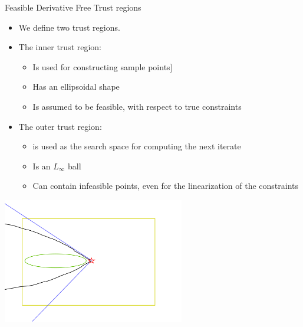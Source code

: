 \documentclass{beamer}
\begin{document}
\begin{frame}{Feasible Derivative Free Trust regions}
    \begin{itemize}
        \item We define two trust regions.
        \item The inner trust region:
            \begin{itemize}
                \item Is used for constructing sample points]
                \item Has an ellipsoidal shape
                \item Is assumed to be feasible, with respect to true constraints
            \end{itemize}
        \item The outer trust region:
            \begin{itemize}
                \item is used as the search space for computing the next iterate
                \item Is an $L_{\infty}$ ball
                \item Can contain infeasible points, even for the linearization of the constraints
            \end{itemize}
    \end{itemize}
\end{frame}


\begin{frame}{}
\begin{center}
    \includegraphics[width=300px]{images/trust_regions.png}
\end{center}
\end{frame}
\end{document}
